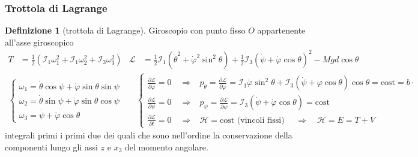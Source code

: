 \documentclass[a4paper,10pt]{article}
\theoremstyle{definition}
\theoremstyle{indentdefinition}
\newtheorem{defn}{Definizione}[section]
\theoremstyle{indenttheorem}
\theoremstyle{myremark}
\theoremstyle{indentgeneral}
\begin{document}
\subsubsection{Trottola di Lagrange}
\begin{defn}[trottola di Lagrange]
\label{def:trottola-di-Lagrange}Giroscopio con punto fisso $O$
appartenente all'asse giroscopico
\begin{align*}
T & =\frac{1}{2}\left(\mathcal{I}_{1}\omega_{1}^{2}+\mathcal{I}_{1}\omega_{2}^{2}+\mathcal{I}_{3}\omega_{3}^{2}\right) & \mathcal{L} & =\frac{1}{2}\mathcal{I}_{1}\left(\dot{\theta}^{2}+\dot{\varphi}^{2}\sin^{2}\theta\right)+\frac{1}{2}\mathcal{I}_{3}\left(\dot{\psi}+\dot{\varphi}\cos\theta\right)^{2}-Mgd\cos\theta
\end{align*}
\begin{align*}
\begin{cases}
\omega_{1}=\dot{\theta}\cos\psi+\dot{\varphi}\sin\theta\sin\psi\\
\omega_{2}=\dot{\theta}\sin\psi+\dot{\varphi}\sin\theta\cos\psi\\
\omega_{3}=\dot{\psi}+\dot{\varphi}\cos\theta
\end{cases} &  & \begin{cases}
\frac{\partial\mathcal{L}}{\partial\varphi}=0\quad\Rightarrow & p_{\theta}=\frac{\partial\mathcal{L}}{\partial\dot{\varphi}}=\mathcal{I}_{1}\dot{\varphi}\sin^{2}\theta+\mathcal{I}_{3}\left(\dot{\psi}+\dot{\varphi}\cos\theta\right)\cos\theta=\text{cost}=b\cdot\\
\frac{\partial\mathcal{L}}{\partial\psi}=0\quad\Rightarrow & p_{\psi}=\frac{\partial\mathcal{L}}{\partial\dot{\psi}}=\mathcal{I}_{3}\left(\dot{\psi}+\dot{\varphi}\cos\theta\right)=\text{cost}\\
\frac{\partial\mathcal{L}}{\partial t}=0\quad\Rightarrow & \mathcal{H}=\text{cost}{\scriptstyle \text{ (vincoli fissi) }}\quad\Rightarrow\quad\mathcal{H}=E=T+V
\end{cases}
\end{align*}
integrali primi i primi due dei quali che sono nell'ordine la conservazione
della componenti lungo gli assi $z$ e $x_{3}$ del momento angolare.


\end{defn}
\end{document}
